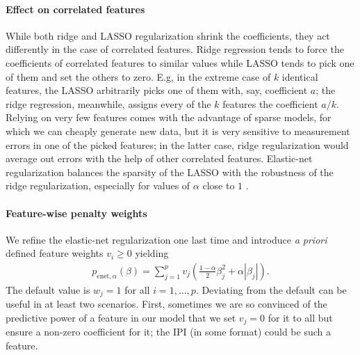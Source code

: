 \paragraph{Effect on correlated features}
While both ridge and LASSO regularization shrink the coefficients, they act differently in the case 
of correlated features. Ridge regression tends to force the coefficients of correlated features to 
similar values while LASSO tends to pick one of them and set the others to zero. E.g, in the 
extreme case of $k$ identical features, the LASSO arbitrarily picks one of them with, say, 
coefficient $a$; the ridge regression, meanwhile, assigns every of the $k$ features the coefficient 
$a/k$. Relying on very few features comes with the advantage of sparse models, for which we 
can cheaply generate new data, but it is very sensitive to measurement errors in one of the picked 
features; in the latter case, ridge regularization would average out errors with the help of other 
correlated features. Elastic-net regularization balances the sparsity of the LASSO with the 
robustness of the ridge regularization, especially for values of $\alpha$ close to $1$ 
\cite{elasticnet05}.

\paragraph{Feature-wise penalty weights}
We refine the elastic-net regularization one last time and introduce \textit{a priori} defined 
feature weights $v_i \geq 0$ yielding
\begin{align}
    p_{\text{enet}, \alpha}(\beta) = \sum_{j=1}^p v_j \left( \frac{1-\alpha}{2} \beta_j^2 +
    \alpha |\beta_j| \right).
\end{align}
The default value is $w_j = 1$ for all $i = 1, \ldots, p$. Deviating from the default can be useful 
in at least two scenarios. First, sometimes we are so convinced of the predictive 
power of a feature in our model that we set $v_j = 0$ for it to all but ensure a non-zero 
coefficient for it; the IPI (in some format) could be such a feature. 


